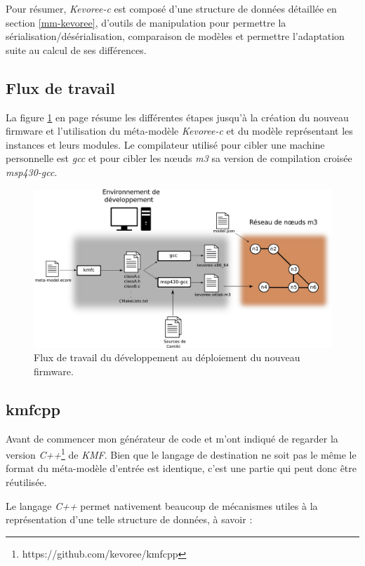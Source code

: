 Pour résumer, \emph{Kevoree-c} est composé d'une structure de données détaillée en section \ref{mm-kevoree}, d'outils de manipulation pour permettre la sérialisation/désérialisation, comparaison de modèles et permettre l'adaptation suite au calcul de ses différences.

\subsection{Flux de travail}

La figure \ref{workfow} en page \pageref{workfow} résume les différentes étapes jusqu'à la création du nouveau firmware et l'utilisation du méta-modèle \emph{Kevoree-c} et du modèle représentant les instances et leurs modules. Le compilateur utilisé pour cibler une machine personnelle est \emph{gcc} et pour cibler les nœuds \emph{m3} sa version de compilation croisée \emph{msp430-gcc}.

\begin{figure}[ht!]
\centering
\includegraphics[scale=0.55]{images/workflow-schema/workflow.pdf}
\caption{Flux de travail du développement au déploiement du nouveau firmware.}
\label{workfow}
\end{figure}

\subsection{\label{kmfcpp}kmfcpp}

Avant de commencer mon générateur de code \johann et \paco m'ont indiqué de regarder la version \emph{C++}\footnote{https://github.com/kevoree/kmfcpp} de \emph{KMF}. Bien que le langage de destination ne soit pas le même le format du méta-modèle d'entrée est identique, c'est une partie qui peut donc être réutilisée.

Le langage \emph{C++} permet nativement beaucoup de mécanismes utiles à la représentation d'une telle structure de données, à savoir :

